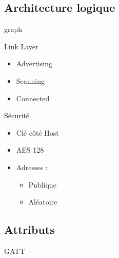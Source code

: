 \subsection{Architecture logique}
\begin{frame}

\begin{minipage}[t]{0.45\linewidth}
graph
\end{minipage}
\begin{minipage}[t]{0.45\linewidth}
	\begin{block}{Link Layer}
		\begin{itemize}
			\item Advertising
			\item Scanning
			\item Connected
		\end{itemize}
	\end{block}
	\begin{block}{Sécurité}
		\begin{itemize}
			\item Clé côté Host
			\item AES 128
			\item Adresses :
			\begin{itemize}
				\item Publique
				\item Aléatoire
			\end{itemize}
		\end{itemize}
	\end{block}
\end{minipage}
\end{frame}

\subsection{Attributs}
\begin{frame}

\begin{minipage}[t]{0.45\linewidth}
\end{minipage}
\begin{minipage}[t]{0.45\linewidth}
\begin{block}{GATT}
\end{block}
\end{minipage}
\end{frame}


